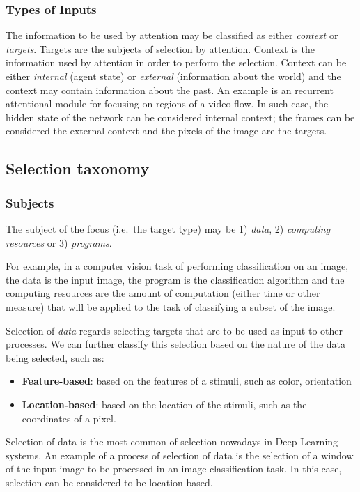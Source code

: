 \documentclass[11pt]{article}
\begin{document}
\subsubsection{Types of Inputs}
The information to be used by attention may be classified as either
\emph{context} or \emph{targets}.
Targets are the subjects of selection by attention.
Context is the information used by attention
in order to perform the selection.
Context can be either \emph{internal} (agent state) or \emph{external}
(information about the world) and the context may contain information
about the past.
An example is an recurrent attentional module for focusing on
regions of a video flow. In such case, the hidden state of the network can
be considered internal context; the frames can be considered the
external context and the pixels of the image are the targets.

\subsection{Selection taxonomy}
\subsubsection{Subjects}
The subject of the focus (i.e.\ the target type) may be 1) \emph{data},
2) \emph{computing resources} or 3) \emph{programs}.

For example, in a computer vision task of performing classification on an image,
the data is the input image, the program is
the classification algorithm and the computing resources are the
amount of computation (either time or other measure) that will be applied
to the task of classifying a subset of the image.

Selection of \emph{data} regards selecting targets that are to be used as input
to other processes.
We can further classify this selection based on the nature of the data being
selected, such as:
\begin{itemize}
    \item \textbf{Feature-based}: based on the features of a stimuli, such as color, orientation\ellipsis\
    \item \textbf{Location-based}: based on the location of the stimuli, such as the coordinates of a pixel.
\end{itemize}
Selection of data is the most common of selection nowadays in
Deep Learning systems.
An example of a process of selection of data
is the selection of a window of the input image to be processed
in an image classification task.
In this case, selection can be considered to be location-based.
\end{document}
